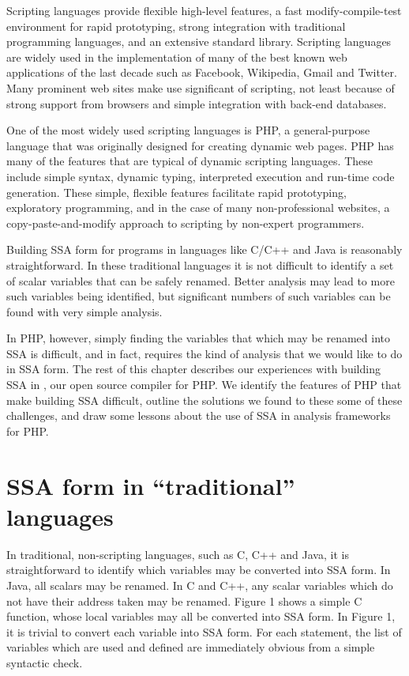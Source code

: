 Scripting languages provide flexible high-level features, a fast modify-compile-test environment for rapid prototyping, strong integration with traditional programming languages, and an extensive standard library.
Scripting languages are widely used in the implementation of many of the best known web applications of the last decade such as Facebook, Wikipedia, Gmail and Twitter.
Many prominent web sites make use significant of scripting, not least because of strong support from browsers and simple integration with back-end databases.

One of the most widely used scripting languages is PHP, a general-purpose language that was originally designed for creating dynamic web pages.
PHP has many of the features that are typical of dynamic scripting languages.
These include simple syntax, dynamic typing, interpreted execution and run-time code generation.
These simple, flexible features facilitate rapid prototyping, exploratory programming, and in the case of many non-professional websites, a copy-paste-and-modify approach to scripting by non-expert programmers.

Building SSA form for programs in languages like C/C++ and Java is reasonably straightforward.
In these traditional languages it is not difficult to identify a set of scalar variables that can be safely renamed.
Better analysis may lead to more such variables being identified, but significant numbers of such variables can be found with very simple analysis.

In PHP, however, simply finding the variables that which may be renamed into SSA is difficult, and in fact, requires the kind of analysis that we would like to do in SSA form.
The rest of this chapter describes our experiences with building SSA in \phc, our open source compiler for PHP.
We identify the features of PHP that make building SSA difficult, outline the solutions we found to these some of these challenges, and draw some lessons about the use of SSA in analysis frameworks for PHP.



\section{SSA form in ``traditional'' languages}

In traditional, non-scripting languages, such as C, C++ and Java, it is straightforward to identify which variables may be converted into SSA form.
In Java, all scalars may be renamed.
In C and C++, any scalar variables which do not have their address taken may be renamed.
Figure 1 shows a simple C function, whose local variables may all be converted into SSA form.
In Figure 1, it is trivial to convert each variable into SSA form.
For each statement, the list of variables which are used and defined are immediately obvious from a simple syntactic check.

